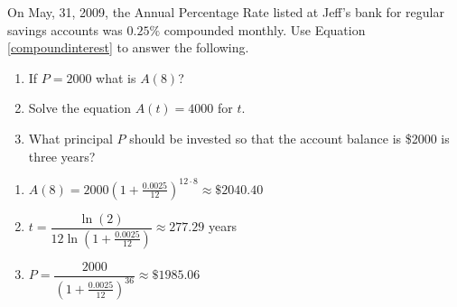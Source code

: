 {On May, 31, 2009, the Annual Percentage Rate listed at Jeff's bank for regular savings accounts was $0.25\%$ compounded monthly.  Use Equation \ref{compoundinterest} to answer the following.

\begin{enumerate}

\item If $P = 2000$ what is $A(8)$?
\item Solve the equation $A(t) = 4000$ for $t$.
\item What principal $P$ should be invested so that the account balance is \$2000 is three years?

\end{enumerate}}
{\begin{enumerate}

\item $A(8) = 2000\left(1 + \frac{0.0025}{12}\right)^{12 \cdot 8} \approx \$2040.40$
\item $t = \dfrac{\ln(2)}{12 \ln\left(1 + \frac{0.0025}{12}\right)} \approx 277.29$ years
\item $P = \dfrac{2000}{\left(1 + \frac{0.0025}{12}\right)^{36}} \approx \$1985.06$

\end{enumerate}}